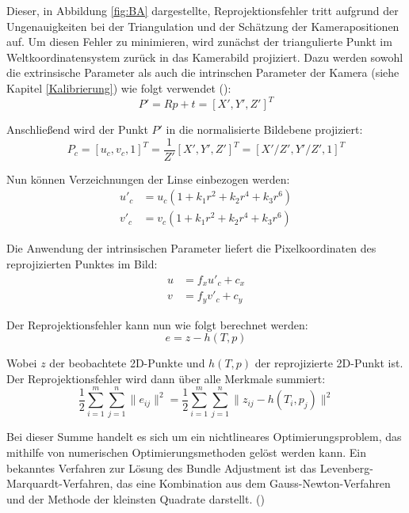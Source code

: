 Dieser, in Abbildung \ref{fig:BA} dargestellte, Reprojektionsfehler tritt aufgrund der Ungenauigkeiten bei der Triangulation und der Schätzung der Kamerapositionen auf. Um diesen Fehler zu minimieren, wird zunächst der triangulierte Punkt im Weltkoordinatensystem zurück in das Kamerabild projiziert. Dazu werden sowohl die extrinsische Parameter als auch die intrinschen Parameter der Kamera (siehe Kapitel \ref{Kalibrierung}) wie folgt verwendet (\cite{gao2021vSLAM}): 
\begin{equation}
    P' = Rp+t = [X', Y', Z']^T
\end{equation}

Anschließend wird der Punkt \( P' \) in die normalisierte Bildebene projiziert:
\begin{equation}
    P_c = [u_c, v_c, 1]^T = \frac{1}{Z'}[X', Y', Z']^T = [X'/Z', Y'/Z', 1]^T
\end{equation}

Nun können Verzeichnungen der Linse einbezogen werden:
\begin{equation}
    \begin{aligned}
        u'_c &= u_c(1 + k_1r^2 + k_2r^4 + k_3r^6) \\
        v'_c &= v_c(1 + k_1r^2 + k_2r^4 + k_3r^6)
    \end{aligned}
\end{equation}

Die Anwendung der intrinsischen Parameter liefert die Pixelkoordinaten des reprojizierten Punktes im Bild:
\begin{equation}
    \begin{aligned}
        u &= f_xu'_c + c_x \\
        v &= f_yv'_c + c_y
    \end{aligned}
\end{equation}

Der Reprojektionsfehler kann nun wie folgt berechnet werden:
\begin{equation}
    e = z - h(T,p)
\end{equation}

Wobei \( z \) der beobachtete 2D-Punkte und \( h(T,p) \) der reprojizierte 2D-Punkt ist. Der Reprojektionsfehler wird dann über alle Merkmale summiert:
\begin{equation}
    \frac{1}{2} \sum_{i=1}^{m} \sum_{j=1}^{n} \| e_{ij} \|^2 = \frac{1}{2} \sum_{i=1}^{m} \sum_{j=1}^{n} \| z_{ij} - h(T_i, p_j) \|^2
\end{equation}

Bei dieser Summe handelt es sich um ein nichtlineares Optimierungsproblem, das mithilfe von numerischen Optimierungsmethoden gelöst werden kann. Ein bekanntes Verfahren zur Lösung des Bundle Adjustment ist das Levenberg-Marquardt-Verfahren, das eine Kombination aus dem Gauss-Newton-Verfahren und der Methode der kleinsten Quadrate darstellt. (\cite{gao2021vSLAM})

